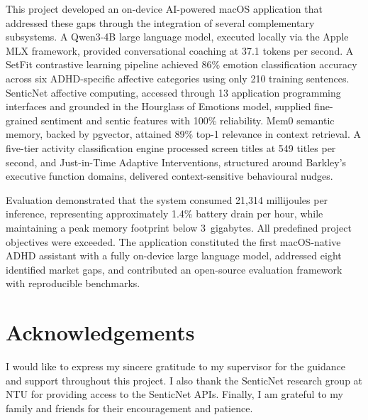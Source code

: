 This project developed an on-device AI-powered macOS application that addressed these gaps through the integration of several complementary subsystems. A Qwen3-4B large language model, executed locally via the Apple MLX framework, provided conversational coaching at 37.1 tokens per second. A SetFit contrastive learning pipeline achieved 86\% emotion classification accuracy across six ADHD-specific affective categories using only 210 training sentences. SenticNet affective computing, accessed through 13 application programming interfaces and grounded in the Hourglass of Emotions model, supplied fine-grained sentiment and sentic features with 100\% reliability. Mem0 semantic memory, backed by pgvector, attained 89\% top-1 relevance in context retrieval. A five-tier activity classification engine processed screen titles at 549 titles per second, and Just-in-Time Adaptive Interventions, structured around Barkley's executive function domains, delivered context-sensitive behavioural nudges.

Evaluation demonstrated that the system consumed 21,314 millijoules per inference, representing approximately 1.4\% battery drain per hour, while maintaining a peak memory footprint below 3~gigabytes. All predefined project objectives were exceeded. The application constituted the first macOS-native ADHD assistant with a fully on-device large language model, addressed eight identified market gaps, and contributed an open-source evaluation framework with reproducible benchmarks.

\newpage

\chapter*{Acknowledgements}

I would like to express my sincere gratitude to my supervisor for the guidance and support throughout this project. I also thank the SenticNet research group at NTU for providing access to the SenticNet APIs. Finally, I am grateful to my family and friends for their encouragement and patience.

\newpage

\tableofcontents
\newpage

\listoffigures
{}
\newpage

